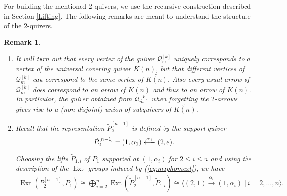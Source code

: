 \documentclass{amsart}
\newtheorem{remark}[theorem]{Remark}
\numberwithin{equation}{section}
\newcommand{\cQ}{\mathcal{Q}}
\newcommand{\Ext}{\operatorname{Ext}}
\newcommand{\ses}[3]{\xymatrix{0\ar[r] & #1\ar[r] & #2\ar[r] & #3 \ar[r] & 0}}
\begin{document}
For building the mentioned $2$-quivers, we use the recursive construction described in Section \ref{Lifting}. The following remarks are meant to understand the structure of the $2$-quivers. 
\begin{remark}\begin{enumerate}\item It will turn out that every vertex of the quiver $\mathcal Q_m^{[k]}$ uniquely corresponds to a vertex of the universal covering quiver $\widetilde{K(n)}$, but that different vertices of $\cQ_m^{[k]}$ can correspond to the same vertex of $\widetilde{K(n)}$. Also every usual arrow of $\mathcal Q_m^{[k]}$ does correspond to an arrow of $\widetilde{K(n)}$ and thus to an arrow of $K(n)$. In particular, the quiver obtained from $\mathcal Q_m^{[k]}$ when forgetting the $2$-arrows gives rise to a (non-disjoint) union of subquivers of $\widetilde{K(n)}$.

\item Recall that the representation $\tilde P_2^{[n-1]}$ is defined by the support quiver
\[
  \tilde P_2^{[n-1]}=(1,\alpha_1)\xlongleftarrow{\alpha_1}(2,e).%
\]

Choosing the lifts $\tilde P_{1,i}$ of $P_1$ supported at $(1,\alpha_i)$ for $2\leq i\leq n$ and using the description of the $\Ext$-groups induced by (\ref{eq:maphomext}), we have 
\begin{align}\label{eq:case2}
  \Ext( P_2^{[n-1]},P_1)\cong \bigoplus_{i=2}^{n}\Ext(\tilde P_2^{[n-1]},\tilde P_{1,i})\cong\langle (2,1)\xrightarrow{\alpha_i}(1,\alpha_i)\mid i=2,\ldots,n\rangle.
\end{align}



\end{enumerate}
\end{remark}
\end{document}
